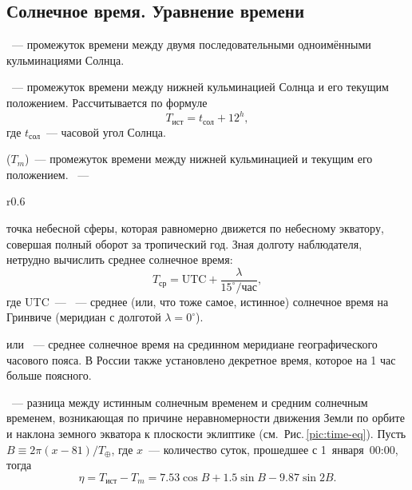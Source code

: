 \subsection{Солнечное время. Уравнение времени}
~--- промежуток времени между двумя последовательными одноимёнными кульминациями Солнца.

~--- промежуток времени между нижней кульминацией Солнца и его текущим положением. Рассчитывается по формуле
\begin{equation}
	T_{\text{ист}} = t_{\text{сол}}+12^h,
\end{equation}
где $t_{\text{сол}}$~--- часовой угол Солнца.

 ($T_m$)~--- промежуток времени между нижней
кульминацией  и текущим его положением. ~--- 
\begin{wrapfigure}[14]{r}{0.6\tw}
	\centering
	\vspace{-1pc}
	\caption{График уравнения времени}
	\label{pic:time-eq}
\end{wrapfigure}
точка небесной сферы, которая равномерно движется по небесному экватору, совершая полный оборот за тропический год. Зная долготу наблюдателя, нетрудно вычислить среднее солнечное время:
\begin{equation*}
T_\text{ср} = \text{UTC} + \frac{\lambda}{15^\circ/\text{час}},
\end{equation*}
где UTC~--- ~--- среднее (или, что тоже самое, истинное) солнечное время на Гринвиче (меридиан с долготой $\lambda = 0^\circ$).

 или ~--- среднее солнечное время на срединном меридиане географического часового пояса. В России также установлено декретное время, которое на 1 час больше поясного.

~--- разница между истинным солнечным временем и средним солнечным временем, возникающая по причине неравномерности движения Земли по орбите и наклона земного экватора к плоскости эклиптике (см.~Рис.\,\ref{pic:time-eq}). Пусть $B \equiv 2 \pi (x - 81)/T_\oplus$, где $x$~--- количество суток, прошедшее с 1~января~00:00, тогда
\begin{equation}
\eta = T_{\text{ист}} - T_m = 7.53 \cos B + 1.5 \sin B - 9.87 \sin 2 B.
\end{equation}